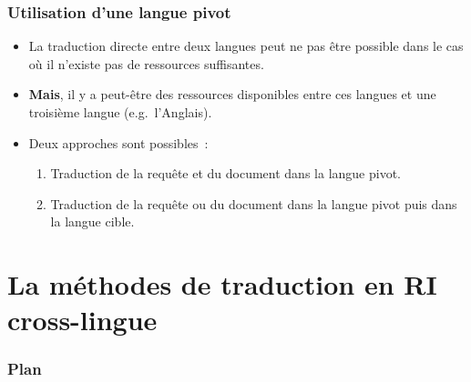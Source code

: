 \documentclass[12pt,aspectratio=43,dvipsnames,table]{beamer}
\begin{document}
\begin{frame}
    \frametitle{Utilisation d'une langue pivot}
    \begin{itemize} \itemsep10pt
        \item La traduction directe entre deux langues peut ne pas être possible
              dans le cas où il n'existe pas de ressources suffisantes.
        \item \textbf{Mais}, il y a peut-être des ressources disponibles entre 
              ces langues et une troisième langue (e.g.~l'Anglais).
        \item Deux approches sont possibles~:
        \begin{enumerate}
            \item Traduction de la requête et du document dans la langue pivot.
            \item Traduction de la requête ou du document dans la langue pivot 
                  puis dans la langue cible.
        \end{enumerate}
    \end{itemize}
\end{frame}


\section{La méthodes de traduction en RI cross-lingue}


\begin{frame}
\frametitle{Plan}
\tableofcontents[sectionstyle=show,subsectionstyle=hide,subsubsectionstyle=hide]
\end{frame}


\begin{frame}
    \frametitle{}
\end{frame}



\begin{frame}
    \frametitle{}
\end{frame}
\end{document}
